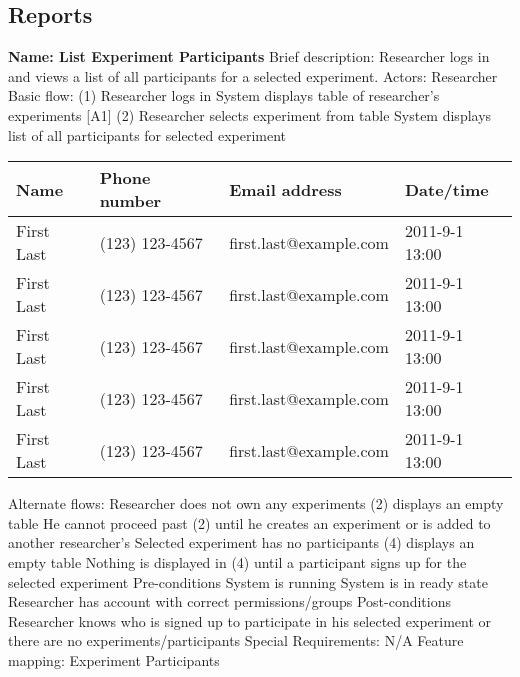 \subsection{Reports}
\begin{outline}[enumerate]

\1 {\bf Name: List Experiment Participants}
\2 Brief description: Researcher logs in and views a list of all participants for a selected experiment.
\2 Actors: Researcher
\2 Basic flow:
\3 (1) Researcher logs in
\3 System displays table of researcher's experiments [A1]
\3 (2) Researcher selects experiment from table
\3 System displays list of all participants for selected experiment
        \begin{table}
            \begin{tabular}{|l|l|l|l|}
                \hline
                Name       & Phone number   & Email address          & Date/time      \\ \hline
                First Last & (123) 123-4567 & first.last@example.com & 2011-9-1 13:00 \\
                First Last & (123) 123-4567 & first.last@example.com & 2011-9-1 13:00 \\
                First Last & (123) 123-4567 & first.last@example.com & 2011-9-1 13:00 \\
                First Last & (123) 123-4567 & first.last@example.com & 2011-9-1 13:00 \\
                First Last & (123) 123-4567 & first.last@example.com & 2011-9-1 13:00 \\
                \hline
            \end{tabular}
        \end{table}
\2 Alternate flows:
\3 [A1] Researcher does not own any experiments
\4 (2) displays an empty table
\4 He cannot proceed past (2) until he creates an experiment or is added to another researcher's
\3 Selected experiment has no participants
\4 (4) displays an empty table
\4 Nothing is displayed in (4) until a participant signs up for the selected experiment
\2 Pre-conditions
\3 System is running
\3 System is in ready state
\3 Researcher has account with correct permissions/groups
\2 Post-conditions
\3 Researcher knows who is signed up to participate in his selected experiment or there are no experiments/participants
\2 Special Requirements:
\3 N/A
\2 Feature mapping:
\3 Experiment Participants



\end{outline}
